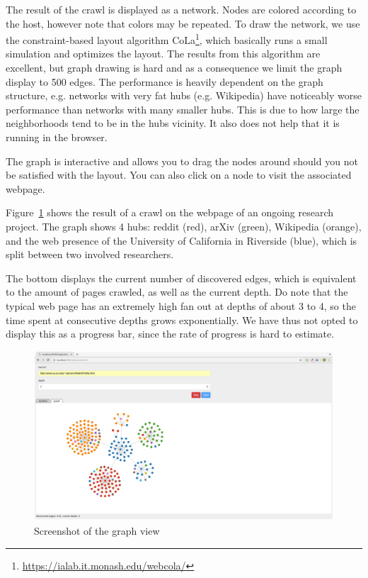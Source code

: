 \documentclass[english]{scrartcl}
\begin{document}
The result of the crawl is displayed as a network. Nodes are colored according
to the host, however note that colors may be repeated. To draw the network, we
use the constraint-based layout algorithm
CoLa\footnote{\url{https://ialab.it.monash.edu/webcola/}}, which basically runs
a small simulation and optimizes the layout. The results from this algorithm
are excellent, but graph drawing is hard and as a consequence we limit the
graph display to 500 edges. The performance is heavily dependent on the graph
structure, e.g. networks with very fat hubs (e.g. Wikipedia) have noticeably
worse performance than networks with many smaller hubs. This is due to how
large the neighborhoods tend to be in the hubs vicinity. It also does not help
that it is running in the browser.

The graph is interactive and allows you to drag the nodes around should
you not be satisfied with the layout. You can also click on a node to
visit the associated webpage.

Figure~\ref{fig:screenshot} shows the result of a crawl on the webpage of an
ongoing research project. The graph shows 4 hubs: reddit (red), arXiv (green),
Wikipedia (orange), and the web presence of the University of California in Riverside
(blue), which is split between two involved researchers.

The bottom displays the current number of discovered edges, which is equivalent
to the amount of pages crawled, as well as the current depth. Do note that the
typical web page has an extremely high fan out at depths of about 3 to 4, so
the time spent at consecutive depths grows exponentially. We have thus not
opted to display this as a progress bar, since the rate of progress is hard to
estimate.

\begin{figure}
    \centering
    \includegraphics[width=\textwidth]{img/screenshot}
    \caption{Screenshot of the graph view}
    \label{fig:screenshot}
\end{figure}
\end{document}

